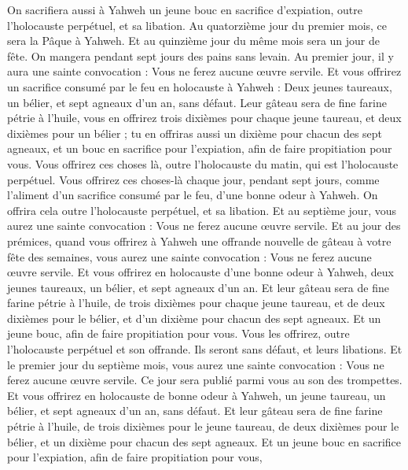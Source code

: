 \begin{multicols}{2}
On sacrifiera aussi à Yahweh un jeune bouc en sacrifice d'expiation, outre l'holocauste perpétuel, et sa libation.
Au quatorzième jour du premier mois, ce sera la Pâque à Yahweh.
Et au quinzième jour du même mois sera un jour de fête. On mangera pendant sept jours des pains sans levain.
Au premier jour, il y aura une sainte convocation : Vous ne ferez aucune œuvre servile.
Et vous offrirez un sacrifice consumé par le feu en holocauste à Yahweh : Deux jeunes taureaux, un bélier, et sept agneaux d'un an, sans défaut.
Leur gâteau sera de fine farine pétrie à l’huile, vous en offrirez trois dixièmes pour chaque jeune taureau, et deux dixièmes pour un bélier ;
tu en offriras aussi un dixième pour chacun des sept agneaux,
et un bouc en sacrifice pour l'expiation, afin de faire propitiation pour vous.
Vous offrirez ces choses là, outre l'holocauste du matin, qui est l'holocauste perpétuel.
Vous offrirez ces choses-là chaque jour, pendant sept jours, comme l'aliment d'un sacrifice consumé par le feu, d'une bonne odeur à Yahweh. On offrira cela outre l'holocauste perpétuel, et sa libation.
Et au septième jour, vous aurez une sainte convocation : Vous ne ferez aucune œuvre servile.
Et au jour des prémices, quand vous offrirez à Yahweh une offrande nouvelle de gâteau à votre fête des semaines, vous aurez une sainte convocation : Vous ne ferez aucune œuvre servile.
Et vous offrirez en holocauste d'une bonne odeur à Yahweh, deux jeunes taureaux, un bélier, et sept agneaux d'un an.
Et leur gâteau sera de fine farine pétrie à l’huile, de trois dixièmes pour chaque jeune taureau, et de deux dixièmes pour le bélier,
et d'un dixième pour chacun des sept agneaux.
Et un jeune bouc, afin de faire propitiation pour vous.
Vous les offrirez, outre l'holocauste perpétuel et son offrande. Ils seront sans défaut, et leurs libations.
\VerseOne{}Et le premier jour du septième mois, vous aurez une sainte convocation : Vous ne ferez aucune œuvre servile. Ce jour sera publié parmi vous au son des trompettes.
Et vous offrirez en holocauste de bonne odeur à Yahweh, un jeune taureau, un bélier, et sept agneaux d'un an, sans défaut.
Et leur gâteau sera de fine farine pétrie à l’huile, de trois dixièmes pour le jeune taureau, de deux dixièmes pour le bélier,
et un dixième pour chacun des sept agneaux.
Et un jeune bouc en sacrifice pour l'expiation, afin de faire propitiation pour vous,

\end{multicols}
